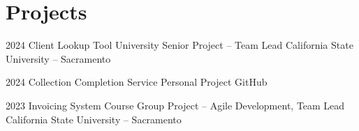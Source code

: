 \section{Projects}

\cventry
    {2024}
    {Client Lookup Tool}
    {University Senior Project -- Team Lead}
    {California State University -- Sacramento}
    {}
    {}
    
\cventry
    {2024}
    {Collection Completion Service}
    {Personal Project}
    {GitHub}
    {}
    {}

\cventry
    {2023}
    {Invoicing System}
    {Course Group Project -- Agile Development, Team Lead}
    {California State University -- Sacramento}
    {}
    {}
